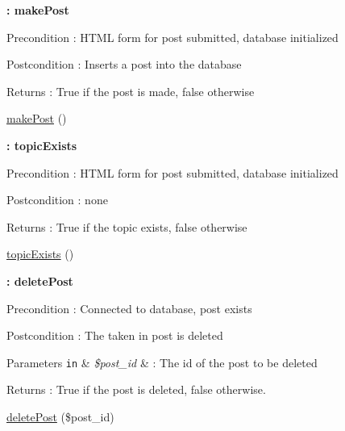\begin{Indent}{\bf \+: make\+Post}\par
{\em \begin{DoxyPrecond}{Precondition}
\+: H\+T\+ML form for post submitted, database initialized 
\end{DoxyPrecond}
\begin{DoxyPostcond}{Postcondition}
\+: Inserts a post into the database 
\end{DoxyPostcond}
\begin{DoxyReturn}{Returns}
\+: True if the post is made, false otherwise 
\end{DoxyReturn}
}\begin{DoxyCompactItemize}
\item 
\hyperlink{class_create_acd5e904704263c1c1a9f92be962f4274}{make\+Post} ()
\end{DoxyCompactItemize}
\end{Indent}
\begin{Indent}{\bf \+: topic\+Exists}\par
{\em \begin{DoxyPrecond}{Precondition}
\+: H\+T\+ML form for post submitted, database initialized 
\end{DoxyPrecond}
\begin{DoxyPostcond}{Postcondition}
\+: none 
\end{DoxyPostcond}
\begin{DoxyReturn}{Returns}
\+: True if the topic exists, false otherwise 
\end{DoxyReturn}
}\begin{DoxyCompactItemize}
\item 
\hyperlink{class_create_a03c40d4ab0e2a05cba3fada43f8fb7b3}{topic\+Exists} ()
\end{DoxyCompactItemize}
\end{Indent}
\begin{Indent}{\bf \+: delete\+Post}\par
{\em \begin{DoxyPrecond}{Precondition}
\+: Connected to database, post exists 
\end{DoxyPrecond}
\begin{DoxyPostcond}{Postcondition}
\+: The taken in post is deleted 
\end{DoxyPostcond}

\begin{DoxyParams}[1]{Parameters}
\mbox{\tt in}  & {\em \$post\+\_\+id} & \+: The id of the post to be deleted \\
\hline
\end{DoxyParams}
\begin{DoxyReturn}{Returns}
\+: True if the post is deleted, false otherwise. 
\end{DoxyReturn}
}\begin{DoxyCompactItemize}
\item 
\hyperlink{class_create_a2647020fd4d43b7d735724078b504c26}{delete\+Post} (\$post\+\_\+id)
\end{DoxyCompactItemize}
\end{Indent}


